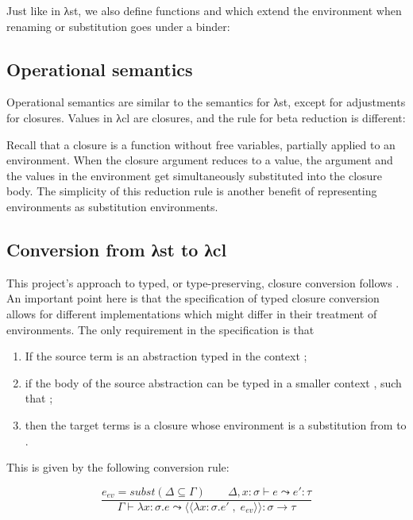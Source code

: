\documentclass[bsc,frontabs,oneside,singlespacing,parskip,deptreport]{infthesis}
\theoremstyle{definition}
\theoremstyle{lemma}
\begin{document}
Just like in λst, we also define functions  and 
which extend the environment when renaming or substitution goes under
a binder:


\subsection{Operational semantics}
\label{sec:oper-semant}

Operational semantics are similar to the semantics for λst, except for
adjustments for closures. Values in λcl are closures, and the rule for
beta reduction is different:


Recall that a closure is a function without free variables,
partially applied to an environment. When the closure argument reduces
to a value, the argument and the values in the environment get
simultaneously substituted into the closure body. The simplicity of
this reduction rule is another benefit of representing environments as
substitution environments.

\subsection{Conversion from λst to λcl}
\label{sec:conversion-from-st}

This project's approach to typed, or type-preserving, closure
conversion follows \cite{DBLP:conf/popl/MinamideMH96}. An important
point here is that the specification of typed closure conversion
allows for different implementations which might differ in their
treatment of environments. The only requirement in the specification
is that

\begin{enumerate}
\item If the source term is an abstraction typed in the context
  ;
\item if the body of the source abstraction can be typed in a smaller
  context , such that ;
\item then the target terms is a closure whose environment is a
  substitution from  to .
\end{enumerate}

This is given by the following conversion rule:

\[
  \frac
  {e_{ev} = subst (\Delta \subseteq \Gamma) \quad \quad \Delta , x : \sigma \vdash e \leadsto e' : \tau }
  {\Gamma \vdash \lambda x : \sigma . e \leadsto
    \langle\langle \lambda x : \sigma . e' \; , \; e_{ev} \rangle\rangle : \sigma \rightarrow \tau}
\]
\end{document}
